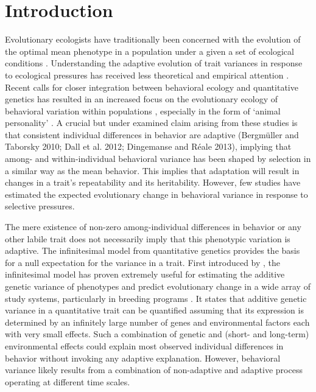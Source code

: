 \documentclass{article}
\begin{document}
\section{Introduction}
Evolutionary ecologists have traditionally been concerned with the evolution of the optimal mean phenotype in a population under a given a set of ecological conditions \citep{Krebs1997a}. Understanding the adaptive evolution of trait variances in response to ecological pressures has received less theoretical and empirical attention  \citep{Bulmer1971, Bull1987}. Recent calls for closer integration between behavioral ecology and quantitative genetics has resulted in an increased focus on the evolutionary ecology of behavioral variation within populations \citep{Westneat2010}, especially in the form of ‘animal personality’ \citep{Dingemanse2010, Dingemanse2013a}. A crucial but under examined claim arising from these studies is that consistent individual differences in behavior are adaptive (Bergmüller and Taborsky 2010; Dall et al. 2012; Dingemanse and Réale 2013), implying that among- and within-individual behavioral variance has been shaped by selection in a similar way as the mean behavior. This implies that adaptation will result in changes in a trait's repeatability and its heritability. However, few studies have estimated the expected evolutionary change in behavioral variance in response to selective pressures. 

The mere existence of non-zero among-individual differences in behavior or any other labile trait does not necessarily imply that this phenotypic variation is adaptive. The infinitesimal model from quantitative genetics provides the basis for a null expectation for the variance in a trait. First introduced by \cite{Fisher1918}, the infinitesimal model has proven extremely useful for estimating the additive genetic variance of phenotypes and predict evolutionary change in a wide array of study systems, particularly in breeding programs \citep{Barton2017}. It states that additive genetic variance in a quantitative trait can be quantified assuming that its expression is determined by an infinitely large number of genes and environmental factors each with very small effects. Such a combination of genetic and (short- and long-term) environmental effects could explain most observed individual differences in behavior without invoking any adaptive explanation. However, behavioral variance likely results from a combination of non-adaptive and adaptive process operating at different time scales. 
\end{document}
